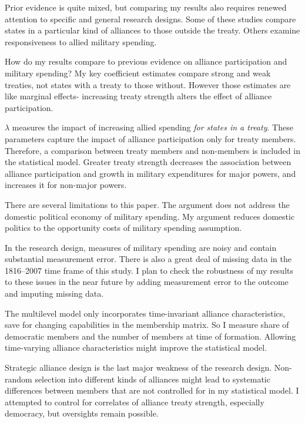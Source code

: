 \documentclass[12pt]{article}
\begin{document}
Prior evidence is quite mixed, but comparing my results also requires renewed attention to specific and general research designs. 
Some of these studies compare states in a particular kind of alliances to those outside the treaty. 
Others examine responsiveness to allied military spending. 


How do my results compare to previous evidence on alliance participation and military spending? 
My key coefficient estimates compare strong and weak treaties, not states with a treaty to those without. 
However those estimates are like marginal effects- increasing treaty strength alters the effect of alliance participation.

 
$\lambda$ measures the impact of increasing allied spending \textit{for states in a treaty}. 
These parameters capture the impact of alliance participation only for treaty members. 
Therefore, a comparison between treaty members and non-members is included in the statistical model. 
Greater treaty strength decreases the association between alliance participation and growth in military expenditures for major powers, and increases it for non-major powers. 


There are several limitations to this paper.
The argument does not address the domestic political economy of military spending. 
My argument reduces domestic politics to the opportunity costs of military spending assumption. 


In the research design, measures of military spending are noisy and contain substantial measurement error. 
There is also a great deal of missing data in the 1816--2007 time frame of this study. 
I plan to check the robustness of my results to these issues in the near future by adding measurement error to the outcome and imputing missing data.


The multilevel model only incorporates time-invariant alliance characteristics, save for changing capabilities in the membership matrix. 
So I measure share of democratic members and the number of members at time of formation. 
Allowing time-varying alliance characteristics might improve the statistical model. 


Strategic alliance design is the last major weakness of the research design. 
Non-random selection into different kinds of alliances might lead to systematic differences between members that are not controlled for in my statistical model. 
I attempted to control for correlates of alliance treaty strength, especially democracy, but oversights remain possible. 
\end{document}
